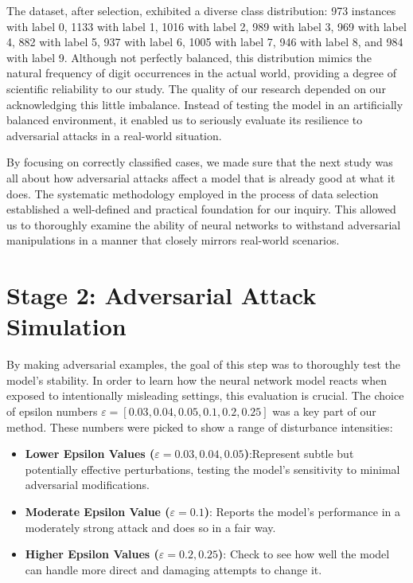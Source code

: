\documentclass[10pt, conference, a4paper, final]{IEEEtran}
\begin{document}
The dataset, after selection, exhibited a diverse class distribution: 973 instances with label 0, 1133 with label 1, 1016 with label 2, 989 with label 3, 969 with label 4, 882 with label 5, 937 with label 6, 1005 with label 7, 946 with label 8, and 984 with label 9. Although not perfectly balanced, this distribution mimics the natural frequency of digit occurrences in the actual world, providing a degree of scientific reliability to our study. The quality of our research depended on our acknowledging this little imbalance. Instead of testing the model in an artificially balanced environment, it enabled us to seriously evaluate its resilience to adversarial attacks in a real-world situation.

By focusing on correctly classified cases, we made sure that the next study was all about how adversarial attacks affect a model that is already good at what it does. The systematic methodology employed in the process of data selection established a well-defined and practical foundation for our inquiry. This allowed us to thoroughly examine the ability of neural networks to withstand adversarial manipulations in a manner that closely mirrors real-world scenarios.

\section{Stage 2: Adversarial Attack Simulation}

By making adversarial examples, the goal of this step was to thoroughly test the model's stability. In order to learn how the neural network model reacts when exposed to intentionally misleading settings, this evaluation is crucial.
The choice of epsilon numbers \( \varepsilon = [0.03,0.04,0.05,0.1, 0.2, 0.25] \) was a key part of our method. These numbers were picked to show a range of disturbance intensities:
\begin{itemize}
    \item \textbf{Lower Epsilon Values (\( \varepsilon = 0.03, 0.04, 0.05 \))}:Represent subtle but potentially effective perturbations, testing the model's sensitivity to minimal adversarial modifications.
    
    \item \textbf{Moderate Epsilon Value (\( \varepsilon = 0.1 \))}: Reports the model's performance in a moderately strong attack and does so in a fair way.
    \item \textbf{Higher Epsilon Values (\( \varepsilon = 0.2, 0.25 \))}: Check to see how well the model can handle more direct and damaging attempts to change it.
\end{itemize}
\end{document}
